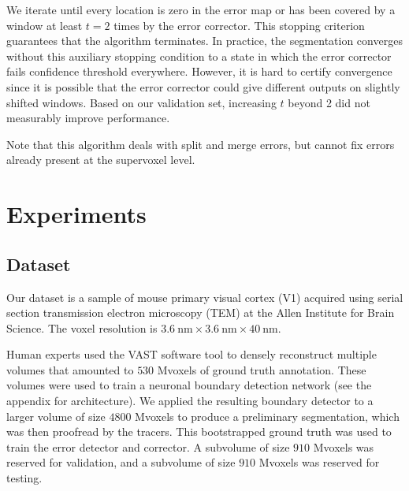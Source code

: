 \documentclass{article}
\begin{document}
We iterate until every location is zero in the error map or has been covered by a window at least $t=2$ times by the error corrector. This stopping criterion guarantees that the algorithm terminates. In practice, the segmentation converges without this auxiliary stopping condition to a state in which the error corrector fails confidence threshold everywhere. However, it is hard to certify convergence since it is possible that the error corrector could give different outputs on slightly shifted windows. Based on our validation set, increasing $t$ beyond 2 did not measurably improve performance.

Note that this algorithm deals with split and merge errors, but cannot fix errors already present at the supervoxel level.



\section{Experiments}
\subsection{Dataset}


Our dataset is a sample of mouse primary visual cortex (V1) acquired using
serial section transmission electron microscopy (TEM) at the Allen Institute for
Brain Science. The voxel resolution is $3.6~\text{nm} \times 3.6~\text{nm}
\times 40~\text{nm}$.

Human experts used the VAST software tool \cite{kasthuri2015saturated, VAST} to densely reconstruct multiple volumes that amounted to $530$ Mvoxels of ground truth annotation. These volumes were used to train a neuronal boundary detection network (see the appendix for architecture). We applied the resulting boundary detector to a larger volume of size $4800$ Mvoxels to produce a preliminary segmentation, which was then proofread by the tracers. This bootstrapped ground truth was used to train the error detector and corrector. A subvolume of size $910$ Mvoxels was reserved for validation, and a subvolume of size $910$ Mvoxels was reserved for testing.
\end{document}
